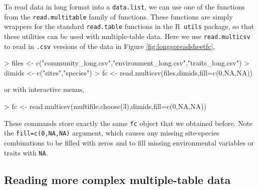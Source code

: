 \documentclass{article}
\newcommand{\R}{{\sf R}}
\newcommand{\code}[1]{\texttt{#1}}
\numberwithin{exercise}{section}
\begin{document}
To read data in long format into a \code{data.list}, we can use one of the functions from the \code{read.multitable} family of functions.  These functions are simply wrappers for the standard \code{read.table} functions in the \R\ \code{utils} package, so that these utilities can be used with multiple-table data.  Here we use \code{read.multicsv} to read in \code{.csv} versions of the data in Figure \ref{fig:longspreadsheetfc},
\begin{Schunk}
\begin{Sinput}
> files <- c("community_long.csv","environment_long.csv","traits_long.csv")
> dimids <- c("sites","species")
> fc <- read.multicsv(files,dimids,fill=c(0,NA,NA))
\end{Sinput}
\end{Schunk}
or with interactive menus,
\begin{Schunk}
\begin{Sinput}
> fc <- read.multicsv(multifile.choose(3),dimids,fill=c(0,NA,NA))
\end{Sinput}
\end{Schunk}
These commands store exactly the same \code{fc} object that we obtained before.  Note the \code{fill=c(0,NA,NA)} argument, which causes any missing site-species combinations to be filled with zeros and to fill missing environmental variables or traits with \code{NA}.

\subsection{Reading more complex multiple-table data}
\end{document}
